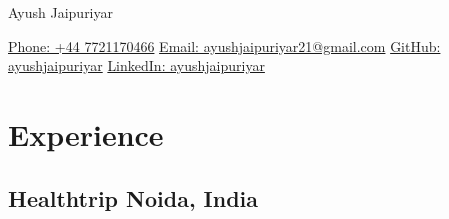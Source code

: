 \documentclass[10pt]{article}
\newcommand{\rside}[1]{
  \hfill {\small\color{accent} #1}%
}
\begin{document}

\begin{center}
  {
    \fontsize{30}{12}
    \selectfont
    \color{accent}
    Ayush Jaipuriyar %
  } \\ \medskip


  \href{tel:+447721170466}{Phone: +44 7721170466} \hspace{0.1em}
  \href{mailto:ayushjaipuriyar21@gmail.com}{Email: ayushjaipuriyar21@gmail.com} \hspace{0.1em}
  \href{https://github.com/ayushjaipuriyar}{GitHub: ayushjaipuriyar} \hspace{0.1em}
  \href{https://www.linkedin.com/in/ayushjaipuriyar}{LinkedIn: ayushjaipuriyar}
\end{center}


\section{Experience}
\subsection{Healthtrip \rside{Noida, India}}
\end{document}
